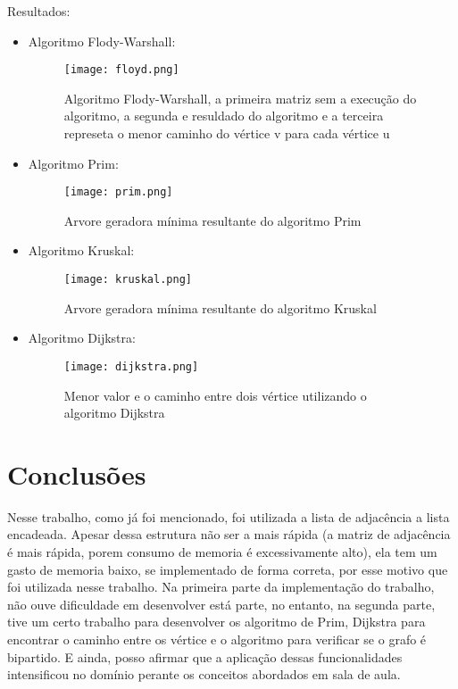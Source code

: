 \documentclass[12pt, fleqn]{article}
\begin{document}
      \par Resultados:
      \begin{itemize}
	\item Algoritmo Flody-Warshall:
	  \begin{figure}[!htpb]
	    \centering
	    \texttt{[image: floyd.png]}
	    \caption{Algoritmo Flody-Warshall, a primeira matriz sem a execução do algoritmo, a segunda e resuldado do algoritmo 
		    e a terceira represeta o menor caminho do vértice v para cada vértice u}
	    \label{fig:Flody}
	  \end{figure}
	\newpage
	\item Algoritmo Prim:
	  \begin{figure}[!htpb]
	    \centering
	    \texttt{[image: prim.png]}
	    \caption{Arvore geradora mínima resultante do algoritmo Prim}
	    \label{fig:prim}
	  \end{figure}
	
	\item Algoritmo Kruskal:
	  \begin{figure}[!htpb]
	    \centering
	    \texttt{[image: kruskal.png]}
	    \caption{Arvore geradora mínima resultante do algoritmo Kruskal}
	    \label{fig:kruskal}
	  \end{figure}
	  
	\item Algoritmo Dijkstra:
	  \begin{figure}[!htpb]
	    \centering
	    \texttt{[image: dijkstra.png]}
	    \caption{Menor valor e o caminho entre dois vértice utilizando o algoritmo Dijkstra}
	    \label{fig:dijkstra}
	  \end{figure}
	  
      \end{itemize}

    \newpage
    \section{Conclusões}
      \par Nesse trabalho, como já foi mencionado, foi utilizada a lista de adjacência a lista encadeada. Apesar dessa estrutura não ser a mais rápida (a matriz de adjacência é mais rápida, porem consumo de memoria é excessivamente alto), ela tem um gasto de memoria baixo, se implementado de forma correta, por esse motivo que foi utilizada nesse trabalho. 
      Na primeira parte da implementação do trabalho, não ouve  dificuldade em desenvolver está parte, no entanto, na segunda parte, tive um certo trabalho para desenvolver os 
      algoritmo de Prim, Dijkstra para encontrar o caminho entre os vértice e o algoritmo para verificar se o grafo é bipartido.
      E ainda, posso afirmar que a aplicação dessas funcionalidades intensificou no domínio perante os conceitos abordados em sala de aula.
\end{document}
